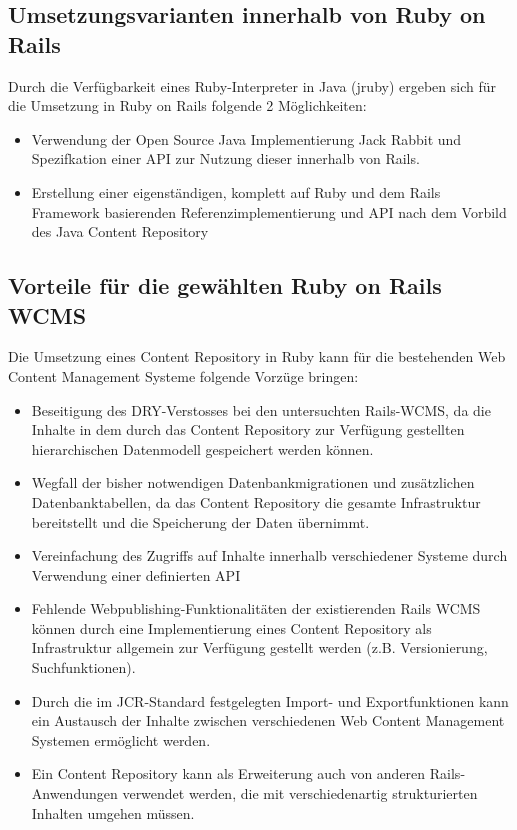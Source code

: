 \subsection{Umsetzungsvarianten innerhalb von Ruby on Rails}

Durch die Verfügbarkeit eines Ruby-Interpreter in Java (jruby) ergeben sich für die Umsetzung in Ruby on Rails folgende 2 Möglichkeiten:

\begin{itemize}
\item
Verwendung der Open Source Java Implementierung Jack Rabbit und Spezifkation einer API zur Nutzung dieser innerhalb von Rails.
\item
Erstellung einer eigenständigen, komplett auf Ruby und dem Rails Framework basierenden Referenzimplementierung und API nach dem Vorbild des Java Content Repository
\end{itemize}


\subsection{Vorteile für die gewählten Ruby on Rails WCMS}

Die Umsetzung eines Content Repository in Ruby kann für die bestehenden Web Content Management Systeme folgende Vorzüge bringen:

\begin{itemize}
\item Beseitigung des DRY-Verstosses bei den untersuchten Rails-WCMS, da die Inhalte in dem durch das Content Repository zur Verfügung gestellten hierarchischen Datenmodell gespeichert werden können.
\item
Wegfall der bisher notwendigen Datenbankmigrationen und zusätzlichen Datenbanktabellen, da das Content Repository die gesamte Infrastruktur bereitstellt und die Speicherung der Daten übernimmt.
\item Vereinfachung des Zugriffs auf Inhalte innerhalb verschiedener Systeme durch Verwendung einer definierten API
\item Fehlende Webpublishing-Funktionalitäten der existierenden Rails WCMS können durch eine Implementierung eines Content Repository als Infrastruktur allgemein zur Verfügung gestellt werden (z.B. Versionierung, Suchfunktionen).
\item Durch die im JCR-Standard festgelegten Import- und Exportfunktionen kann ein Austausch der Inhalte zwischen verschiedenen Web Content Management Systemen ermöglicht werden.
\item Ein Content Repository kann als Erweiterung auch von anderen Rails-Anwendungen verwendet werden, die mit verschiedenartig strukturierten Inhalten umgehen müssen.
\end{itemize}



